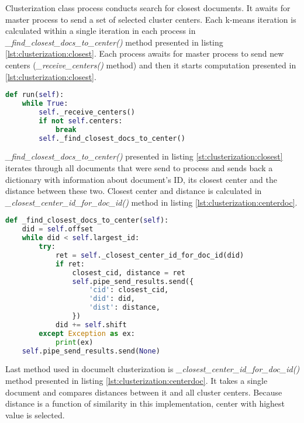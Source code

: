 Clusterization class process conducts search for closest documents. It awaits for master process to send a set of selected cluster centers. Each k-means iteration is calculated within a single iteration in each process in \textit{\_find\_closest\_docs\_to\_center()} method presented in listing \ref{lst:clusterization:closest}. Each process awaits for master process to send new centers (\textit{\_receive\_centers()} method) and then it starts computation presented in \ref{lst:clusterization:closest}.

\begin{lstlisting}[language=Python, caption={Clusterization.run() - Clusterization class process main method}, label={lst:clusterization:run}]
def run(self):
    while True:
        self._receive_centers()
        if not self.centers:
            break
        self._find_closest_docs_to_center()
\end{lstlisting}

\textit{\_find\_closest\_docs\_to\_center()} presented in listing \ref{st:clusterization:closest} iterates through all documents that were send to process and sends back a dictionary with information about document's ID, its closest center and the distance between these two. Closest center and distance is calculated in \textit{\_closest\_center\_id\_for\_doc\_id()} method in listing \ref{lst:clusterization:centerdoc}.

\begin{lstlisting}[language=Python, caption={Clusterization.\_find\_closest\_docs\_to\_center() - Finding closest center for a document during clusterization, part 1}, label={lst:clusterization:closest}]
def _find_closest_docs_to_center(self):
    did = self.offset
    while did < self.largest_id:
        try:
            ret = self._closest_center_id_for_doc_id(did)
            if ret:
                closest_cid, distance = ret
                self.pipe_send_results.send({
                    'cid': closest_cid,
                    'did': did,
                    'dist': distance,
                })
            did += self.shift
        except Exception as ex:
            print(ex)
    self.pipe_send_results.send(None)
\end{lstlisting}

Last method used in documelt clusterization is \textit{ \_closest\_center\_id\_for\_doc\_id()} method presented in listing \ref{lst:clusterization:centerdoc}. It takes a single document and compares distances between it and all cluster centers. Because distance is a function of similarity in this implementation, center with highest value is selected.

